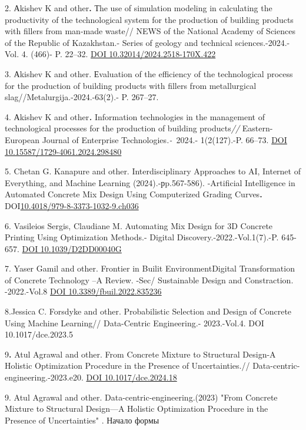 {2. Аkishev K and other{\bfseries .} Тhe use of simulation modeling in
calculating the productivity of the technological system for the
production of building products with fillers from man-made waste// NEWS
of the National Academy of Sciences of the Republic of Kazakhstan.-
Series of geology and technical sciences.-2024.-Vol. 4. (466)- P.
22--32. \href{https://doi.org/10.32014/2024.2518-170X.422}{DOI
10.32014/2024.2518-170X.422}

3. Аkishev K and other. Еvaluation of the efficiency of the
technological process for the production of building products with
fillers from metallurgical slag//Metalurgija.-2024.-63(2).- P. 267--27.

4. Аkishev K and other\emph{{\bfseries .}} Information technologies in the
management of technological processes for the production of building
products\emph{//} Eastern-European Journal of Enterprise
Technologies\emph{.-~}2024.- 1(2(127).-P. 66--73.
\href{https://doi.org/10.15587/1729-4061.2024.298480}{DOI
10.15587/1729-4061.2024.298480}

5. Chetan G. Kanapure and other. Interdisciplinary Approaches to AI,
Internet of Everything, and Machine Learning (2024).-рp.567-586).
-Artificial Intelligence in Automated Concrete Mix Design Using
Computerized Grading Curves{\bfseries .}
DOI\href{http://dx.doi.org/10.4018/979-8-3373-1032-9.ch036}{10.4018/979-8-3373-1032-9.ch036}

6. Vasileios Sergis, Claudiane M. Automating Mix Design for 3D Concrete
Printing Using Optimization Methods.- Digital
Discovery.-2022.-Vol.1(7).-P. 645-657.
\href{https://doi.org/10.1039/D2DD00040G}{DOI 10.1039/D2DD00040G}

7. Yaser Gamil and other. Frontier in Builit EnvironmentDigital
Transformation of Concrete Technology --A Review. -Sec/ Sustainable
Design and Constraction. -2022.-Vol.8
\href{https://doi.org/10.3389/fbuil.2022.835236}{DOI
10.3389/fbuil.2022.835236}

8.Jessica C. Forsdyke and other. Probabilistic Selection and Design of
Concrete Using Machine Learning// Data-Centric Engineering.-
2023.-Vol.4. DOI 10.1017/dce.2023.5

9{\bfseries .} Atul Agrawal and other. From Concrete Mixture to Structural
Design-A Holistic Optimization Procedure in the Presence of
Uncertainties.// Data-centric-engineering.-2023.e20.
\href{https://doi.org/10.1017/dce.2024.18}{DOI 10.1017/dce.2024.18}

9. Atul Agrawal and other. Data-centric-engineering.(2023) "From
Concrete Mixture to Structural Design---A Holistic Optimization
Procedure in the Presence of Uncertainties" . Начало формы

}

